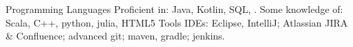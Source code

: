 \begin{cvskills}
  \cvskill
    {Programming Languages}
    {Proficient in: Java, Kotlin, SQL, \LaTeXe{}. 
       Some knowledge of:
       Scala, C++, python, julia, HTML5}
 \cvskill
  {Tools}
  {IDEs: Eclipse, IntelliJ;
  Atlassian JIRA \& Confluence;
   advanced git;
  maven, gradle;
   jenkins.
  }
\end{cvskills}

